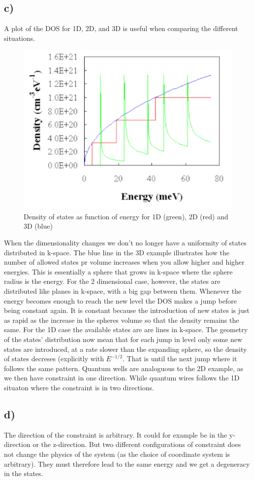 \documentclass{article}
\begin{document}
\subsection*{c)}
A plot of the DOS for 1D, 2D, and 3D is useful when comparing the different situations.
\begin{figure}[H]
	\includegraphics[width = 0.7\linewidth]{dos.png}
	\centering
	\caption{Density of states as function of energy for 1D (green), 2D (red) and 3D (blue)}
\end{figure}

When the dimensionality changes we don't no longer have a uniformity of states distributed in k-space. The blue line in the 3D example illustrates how the number of allowed states pr volume increases when you allow higher and higher energies. This is essentially a sphere that grows in k-space where the sphere radius is the energy. For the 2 dimensional case, however, the states are distributed like planes in k-space, with a big gap between them. Whenever the energy becomes enough to reach the new level the DOS makes a jump before being constant again. It is constant because the introduction of new states is just as rapid as the increase in the spheres volume so that the density remains the same. For the 1D case the available states are are lines in k-space. The geometry of the states' distribution now mean that for each jump in level only some new states are introduced, at a rate slower than the expanding sphere, so the density of states decreses (explicitly with $E^{-1/2}$. That is until the next jump where it follows the same pattern. Quantum wells are analoguous to the 2D example, as we then have constraint in one direction. While quantum wires follows the 1D situaton where the constraint is in two directions.

\subsection*{d)}
The direction of the constraint is arbitrary. It could for example be in the y-direction or the z-direction. But two different configurations of constraint does not change the physics of the system (as the choice of coordinate system is arbitrary). They must therefore lead to the same energy and we get a degeneracy in the states. 
\end{document}
